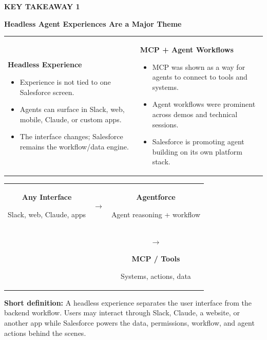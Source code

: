 \documentclass[11pt]{article}
\newcommand{\slide}[1]{%
  \clearpage
  \begin{tcolorbox}[
    enhanced,
    colback=white,
    colframe=line,
    boxrule=0.6pt,
    arc=4pt,
    width=\textwidth,
    height=9.0in,
    left=14pt,
    right=14pt,
    top=14pt,
    bottom=14pt
  ]
  #1
  \end{tcolorbox}
}
\newcommand{\kicker}[1]{\textcolor{dark}{\footnotesize\bfseries\MakeUppercase{#1}}\vspace{6pt}}
\newcommand{\slidetitle}[1]{{\color{ink}\LARGE\bfseries #1}\par\vspace{12pt}}
\newcommand{\boxtitle}[1]{{\bfseries #1}\par}
\newcommand{\smallmuted}[1]{{\small\textcolor{muted}{#1}}}
\begin{document}
\slide{
  \kicker{Key Takeaway 1}\par
  \slidetitle{Headless Agent Experiences Are a Major Theme}
  \begin{tabularx}{\textwidth}{XX}
    \begin{plainbox}
      \boxtitle{Headless Experience}
      \begin{itemize}
        \item Experience is not tied to one Salesforce screen.
        \item Agents can surface in Slack, web, mobile, Claude, or custom apps.
        \item The interface changes; Salesforce remains the workflow/data engine.
      \end{itemize}
    \end{plainbox}
    &
    \begin{plainbox}
      \boxtitle{MCP + Agent Workflows}
      \begin{itemize}
        \item MCP was shown as a way for agents to connect to tools and systems.
        \item Agent workflows were prominent across demos and technical sessions.
        \item Salesforce is promoting agent building on its own platform stack.
      \end{itemize}
    \end{plainbox}
  \end{tabularx}
  \vspace{18pt}
  \begin{center}
    \begin{tabular}{ccc}
      \begin{plainbox}[width=1.9in]\boxtitle{Any Interface}\smallmuted{Slack, web, Claude, apps}\end{plainbox}
      & \(\rightarrow\) &
      \begin{plainbox}[width=1.9in]\boxtitle{Agentforce}\smallmuted{Agent reasoning + workflow}\end{plainbox}
      \\[10pt]
      && \(\rightarrow\) \quad
      \begin{plainbox}[width=1.9in]\boxtitle{MCP / Tools}\smallmuted{Systems, actions, data}\end{plainbox}
    \end{tabular}
  \end{center}
  \vfill
  \begin{calloutbox}
    \textbf{Short definition:} A headless experience separates the user interface from the backend workflow. Users may interact through Slack, Claude, a website, or another app while Salesforce powers the data, permissions, workflow, and agent actions behind the scenes.
  \end{calloutbox}
}
\end{document}

